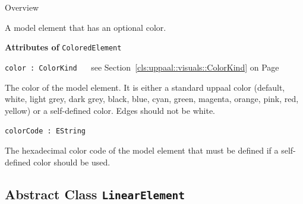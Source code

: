 	\begin{longdescription}
		\item[Overview] 		
				

	

		A model element that has an optional color.		
		
	
			\item[\textbf{Attributes of} \texttt{ColoredElement}] ~
			\begin{longdescription}
	\item[\texttt{color : ColorKind 	}] ~
	see Section~\ref{cls:uppaal::visuals::ColorKind} on Page~\pageref{cls:uppaal::visuals::ColorKind}
	
	\nopagebreak
		
				

	

		The color of the model element. It is either a standard uppaal color (default, white, light grey, dark grey, black, blue, cyan, green, magenta, orange, pink, red, yellow) or a self-defined color. Edges should not be white.

	\item[\texttt{colorCode : EString 	}] ~
	
	
	\nopagebreak
		
				

	

		The hexadecimal color code of the model element that must be defined if a self-defined color should be used.		
			\end{longdescription}
	
	\end{longdescription}
	

\subsection{Abstract Class \bfseries \texttt{LinearElement}\normalfont}
\label{cls:uppaal::visuals::LinearElement} 
	
